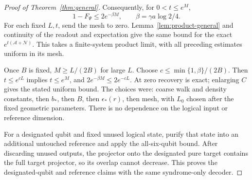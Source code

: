 \begin{proof}[Proof of Theorem~\ref{thm:general}]
Consequently, for \(0<t\le e^M\),
\[
 1-F_\Psi\le2e^{-\beta M},\qquad
                  \beta=\gamma a\log2/4 .
\]
For each fixed \(L,t\), send the mesh to zero.
Lemma~\ref{lem:product-general} and continuity of
the readout and expectation give the same bound
for the exact \(e^{t(\mathcal A+\mathcal N)}\).
This takes a finite-system product limit, with
all preceding estimates uniform in its mesh.

Once \(B\) is fixed, \(M\ge L/(2B)\) for large \(L\).
Choose \(c\le\min\{1,\beta\}/(2B)\).
Then \(t\le e^{cL}\) implies \(t\le e^M\), and
\(2e^{-\beta M}\le2e^{-cL}\).
At zero recovery is exact; enlarging \(C\)
gives the stated uniform bound.
The choices were: coarse walk and density
constants, then \(b_*\), then \(B\), then
\(\epsilon_*(r)\), then mesh, with \(L_0\)
chosen after the fixed geometric parameters.
There is no dependence on the logical input
or reference dimension.

For a designated qubit and fixed unused logical
state, purify that state into an additional
untouched reference and apply the all-six-qubit
bound. After discarding unused outputs,
the projector onto the designated pure target
contains the full target projector, so its overlap
cannot decrease.
This proves the designated-qubit and reference
claims with the same syndrome-only decoder.
\end{proof}
